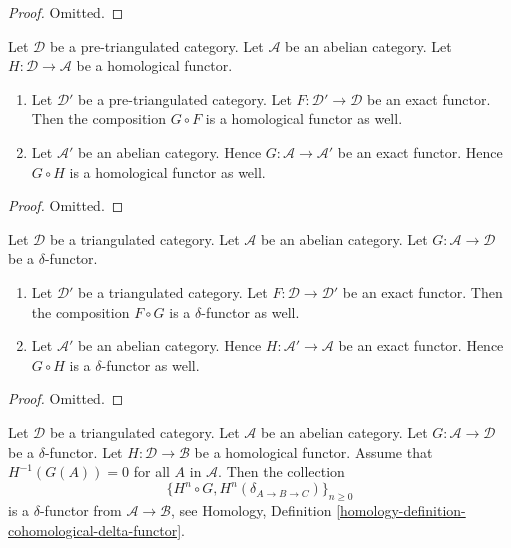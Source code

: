 \begin{proof}
Omitted.
\end{proof}

\begin{lemma}
\label{lemma-exact-compose-homological-functor}
Let $\mathcal{D}$ be a pre-triangulated category.
Let $\mathcal{A}$ be an abelian category.
Let $H : \mathcal{D} \to \mathcal{A}$ be a homological functor.
\begin{enumerate}
\item Let $\mathcal{D}'$ be a pre-triangulated category.
Let $F : \mathcal{D}' \to \mathcal{D}$ be an exact functor.
Then the composition $G \circ F$ is a homological functor as well.
\item Let $\mathcal{A}'$ be an abelian category. Hence
$G : \mathcal{A} \to \mathcal{A}'$ be an exact functor.
Hence $G \circ H$ is a homological functor as well.
\end{enumerate}
\end{lemma}

\begin{proof}
Omitted.
\end{proof}

\begin{lemma}
\label{lemma-exact-compose-delta-functor}
Let $\mathcal{D}$ be a triangulated category.
Let $\mathcal{A}$ be an abelian category.
Let $G : \mathcal{A} \to \mathcal{D}$ be a $\delta$-functor.
\begin{enumerate}
\item Let $\mathcal{D}'$ be a triangulated category.
Let $F : \mathcal{D} \to \mathcal{D}'$ be an exact functor.
Then the composition $F \circ G$ is a $\delta$-functor as well.
\item Let $\mathcal{A}'$ be an abelian category. Hence
$H : \mathcal{A}' \to \mathcal{A}$ be an exact functor.
Hence $G \circ H$ is a $\delta$-functor as well.
\end{enumerate}
\end{lemma}

\begin{proof}
Omitted.
\end{proof}

\begin{lemma}
\label{lemma-compose-delta-functor-homological}
Let $\mathcal{D}$ be a triangulated category.
Let $\mathcal{A}$ be an abelian category.
Let $G : \mathcal{A} \to \mathcal{D}$ be a $\delta$-functor.
Let $H : \mathcal{D} \to \mathcal{B}$ be a homological functor.
Assume that $H^{-1}(G(A)) = 0$ for all $A$ in $\mathcal{A}$.
Then the collection
$$
\{H^n \circ G, H^n(\delta_{A \to B \to C})\}_{n \geq 0}
$$
is a $\delta$-functor from $\mathcal{A} \to \mathcal{B}$, see
Homology, Definition \ref{homology-definition-cohomological-delta-functor}.
\end{lemma}

